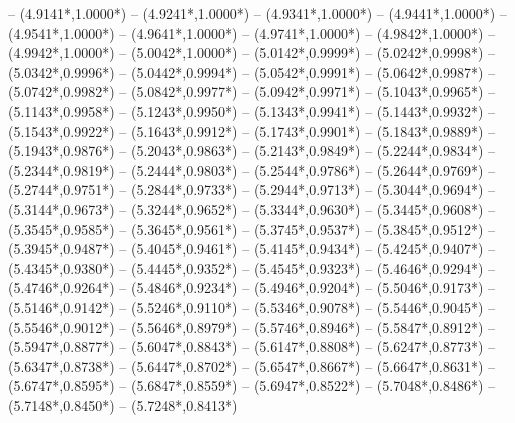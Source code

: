 {	-- ({4.9141*\dx},{1.0000*\dy})
	-- ({4.9241*\dx},{1.0000*\dy})
	-- ({4.9341*\dx},{1.0000*\dy})
	-- ({4.9441*\dx},{1.0000*\dy})
	-- ({4.9541*\dx},{1.0000*\dy})
	-- ({4.9641*\dx},{1.0000*\dy})
	-- ({4.9741*\dx},{1.0000*\dy})
	-- ({4.9842*\dx},{1.0000*\dy})
	-- ({4.9942*\dx},{1.0000*\dy})
	-- ({5.0042*\dx},{1.0000*\dy})
	-- ({5.0142*\dx},{0.9999*\dy})
	-- ({5.0242*\dx},{0.9998*\dy})
	-- ({5.0342*\dx},{0.9996*\dy})
	-- ({5.0442*\dx},{0.9994*\dy})
	-- ({5.0542*\dx},{0.9991*\dy})
	-- ({5.0642*\dx},{0.9987*\dy})
	-- ({5.0742*\dx},{0.9982*\dy})
	-- ({5.0842*\dx},{0.9977*\dy})
	-- ({5.0942*\dx},{0.9971*\dy})
	-- ({5.1043*\dx},{0.9965*\dy})
	-- ({5.1143*\dx},{0.9958*\dy})
	-- ({5.1243*\dx},{0.9950*\dy})
	-- ({5.1343*\dx},{0.9941*\dy})
	-- ({5.1443*\dx},{0.9932*\dy})
	-- ({5.1543*\dx},{0.9922*\dy})
	-- ({5.1643*\dx},{0.9912*\dy})
	-- ({5.1743*\dx},{0.9901*\dy})
	-- ({5.1843*\dx},{0.9889*\dy})
	-- ({5.1943*\dx},{0.9876*\dy})
	-- ({5.2043*\dx},{0.9863*\dy})
	-- ({5.2143*\dx},{0.9849*\dy})
	-- ({5.2244*\dx},{0.9834*\dy})
	-- ({5.2344*\dx},{0.9819*\dy})
	-- ({5.2444*\dx},{0.9803*\dy})
	-- ({5.2544*\dx},{0.9786*\dy})
	-- ({5.2644*\dx},{0.9769*\dy})
	-- ({5.2744*\dx},{0.9751*\dy})
	-- ({5.2844*\dx},{0.9733*\dy})
	-- ({5.2944*\dx},{0.9713*\dy})
	-- ({5.3044*\dx},{0.9694*\dy})
	-- ({5.3144*\dx},{0.9673*\dy})
	-- ({5.3244*\dx},{0.9652*\dy})
	-- ({5.3344*\dx},{0.9630*\dy})
	-- ({5.3445*\dx},{0.9608*\dy})
	-- ({5.3545*\dx},{0.9585*\dy})
	-- ({5.3645*\dx},{0.9561*\dy})
	-- ({5.3745*\dx},{0.9537*\dy})
	-- ({5.3845*\dx},{0.9512*\dy})
	-- ({5.3945*\dx},{0.9487*\dy})
	-- ({5.4045*\dx},{0.9461*\dy})
	-- ({5.4145*\dx},{0.9434*\dy})
	-- ({5.4245*\dx},{0.9407*\dy})
	-- ({5.4345*\dx},{0.9380*\dy})
	-- ({5.4445*\dx},{0.9352*\dy})
	-- ({5.4545*\dx},{0.9323*\dy})
	-- ({5.4646*\dx},{0.9294*\dy})
	-- ({5.4746*\dx},{0.9264*\dy})
	-- ({5.4846*\dx},{0.9234*\dy})
	-- ({5.4946*\dx},{0.9204*\dy})
	-- ({5.5046*\dx},{0.9173*\dy})
	-- ({5.5146*\dx},{0.9142*\dy})
	-- ({5.5246*\dx},{0.9110*\dy})
	-- ({5.5346*\dx},{0.9078*\dy})
	-- ({5.5446*\dx},{0.9045*\dy})
	-- ({5.5546*\dx},{0.9012*\dy})
	-- ({5.5646*\dx},{0.8979*\dy})
	-- ({5.5746*\dx},{0.8946*\dy})
	-- ({5.5847*\dx},{0.8912*\dy})
	-- ({5.5947*\dx},{0.8877*\dy})
	-- ({5.6047*\dx},{0.8843*\dy})
	-- ({5.6147*\dx},{0.8808*\dy})
	-- ({5.6247*\dx},{0.8773*\dy})
	-- ({5.6347*\dx},{0.8738*\dy})
	-- ({5.6447*\dx},{0.8702*\dy})
	-- ({5.6547*\dx},{0.8667*\dy})
	-- ({5.6647*\dx},{0.8631*\dy})
	-- ({5.6747*\dx},{0.8595*\dy})
	-- ({5.6847*\dx},{0.8559*\dy})
	-- ({5.6947*\dx},{0.8522*\dy})
	-- ({5.7048*\dx},{0.8486*\dy})
	-- ({5.7148*\dx},{0.8450*\dy})
	-- ({5.7248*\dx},{0.8413*\dy})
}
